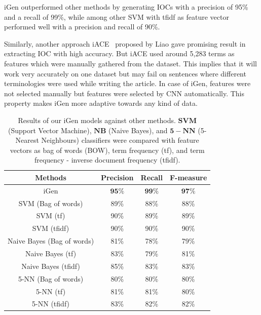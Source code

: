 iGen outperformed other methods by generating IOCs with a precision of 95\% and a recall of 99\%, while among other SVM with tfidf as feature vector performed well with a precision and recall of 90\%.

Similarly, another approach iACE~\cite{liao} proposed by Liao gave promising result in extracting IOC with high accuracy. But iACE used around 5,283 terms as features which were manually gathered from the dataset. This implies that it will work very accurately on one dataset but may fail on sentences where different terminologies were used while writing the article. In case of iGen, features were not selected manually but features were selected by CNN automatically. This property makes iGen more adaptive towards any kind of data. 
 

\begin{table}[tb]
\caption{Results of our iGen models against other methods. $\mathbf{SVM}$ (Support Vector Machine), $\mathbf{NB}$ (Naive Bayes), and $\mathbf{5-NN}$ (5-Nearest Neighbours) classifiers were compared with feature vectors as bag of words (BOW), term frequency (tf), and term frequency - inverse document frequency (tfidf).  } %
\centering %
\begin{tabular}{c c c c} %
\hline\hline %
Methods & Precision & Recall & F-measure \\ [0.5ex] %
\hline %
iGen & $\mathbf{95\%}$ & $\mathbf{99\%}$ & $\mathbf{97\%}$ \\
SVM (Bag of words) & 89\% & 88\% & 88\% \\ %
SVM (tf) &  90\% & 89\% & 89\% \\
SVM (tfidf) &  90\% & 90\% & 90\% \\
Naive Bayes (Bag of words) & 81\% & 78\% & 79\% \\ %
Naive Bayes (tf) &  83\% & 79\% & 81\% \\
Naive Bayes (tfidf) &  85\% & 83\% & 83\% \\
5-NN (Bag of words) & 80\% & 80\% & 80\% \\ %
5-NN (tf) &  81\% & 81\% & 80\% \\
5-NN (tfidf) &  83\% & 82\% & 82\% \\[1ex] %

\hline %
\end{tabular}
\label{table:methodcompare} %
\end{table}